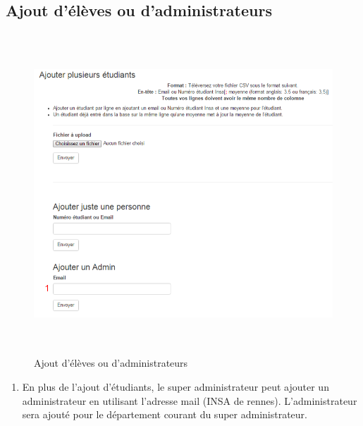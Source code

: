   \subsection{Ajout d'élèves ou d'administrateurs}
  \begin{figure}[H]
  	\centering
  	
  	\includegraphics[width=16cm,height=12cm]{Images/Super_Admin/ajout_gens_super_admin}
  	\caption{Ajout d'élèves ou d'administrateurs}
  	\label{agsa}
  \end{figure}
    
    \begin{enumerate}
    	\item En plus de l'ajout d'étudiants, le super administrateur peut ajouter un administrateur en utilisant l'adresse mail (INSA de rennes). L'administrateur sera ajouté pour le département courant du super administrateur.
    \end{enumerate}